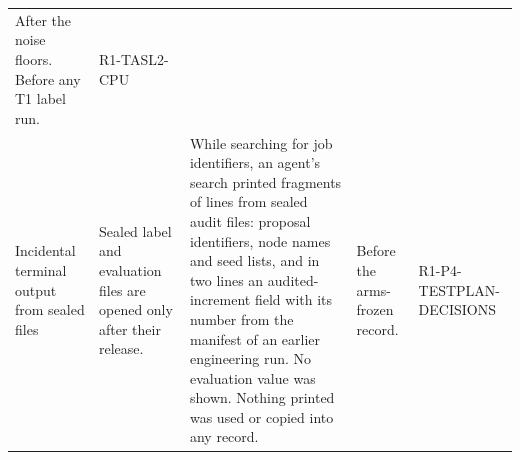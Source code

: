 \begin{table}[t]
\begin{tabular}{L{0.8in}L{1.3in}L{1.9in}L{1.25in}L{0.98in}}
After the noise floors. Before any T1 label run. &
R1-TASL2-CPU \\
\addlinespace
Incidental terminal output from sealed files &
Sealed label and evaluation files are opened only after their release. &
While searching for job identifiers, an agent's search printed fragments of lines from sealed audit files: proposal identifiers, node names and seed lists, and in two lines an audited-increment field with its number from the manifest of an earlier engineering run. No evaluation value was shown. Nothing printed was used or copied into any record. &
Before the arms-frozen record.  &
R1-P4-TESTPLAN-DECISIONS \\
\bottomrule
\end{tabular}
\end{table}


